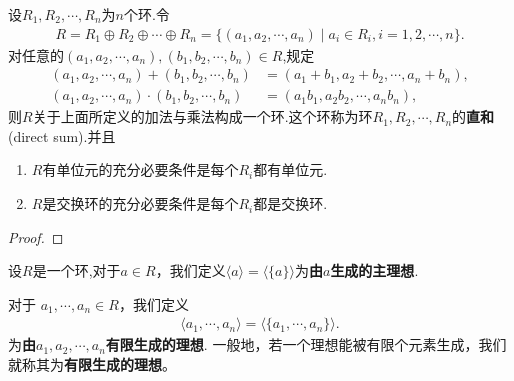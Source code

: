 \documentclass[../../main.tex]{subfiles}%
\begin{document}
\begin{theorem}
设$R_1,R_2,\cdots,R_n$为$n$个环.令
\begin{align*}
R = R_1 \oplus R_2 \oplus \cdots \oplus R_n = \{(a_1,a_2,\cdots,a_n) \mid a_i \in R_i, i=1,2,\cdots,n\}.
\end{align*}
对任意的$(a_1,a_2,\cdots,a_n),(b_1,b_2,\cdots,b_n) \in R$,规定
\begin{align*}
(a_1,a_2,\cdots,a_n) + (b_1,b_2,\cdots,b_n) &= (a_1 + b_1,a_2 + b_2,\cdots,a_n + b_n), \\
(a_1,a_2,\cdots,a_n) \cdot (b_1,b_2,\cdots,b_n) &= (a_1b_1,a_2b_2,\cdots,a_nb_n),
\end{align*}
则$R$关于上面所定义的加法与乘法构成一个环.这个环称为环$R_1,R_2,\cdots,R_n$的\textbf{直和}(direct sum).并且
\begin{enumerate}[(1)]
\item $R$有单位元的充分必要条件是每个$R_i$都有单位元.

\item $R$是交换环的充分必要条件是每个$R_i$都是交换环.
\end{enumerate}
\end{theorem}
\begin{proof}

\end{proof}

\begin{definition}
设$R$是一个环,对于$a\in R$，我们定义$\langle a\rangle=\langle \{a\} \rangle$为\textbf{由$a$生成的主理想}.

对于 $a_1, \cdots, a_n \in R$，我们定义
\begin{align*}
\langle a_1, \cdots, a_n\rangle = \langle\{a_1, \cdots, a_n\}\rangle.
\end{align*}
为\textbf{由$a_1,a_2,\cdots,a_n$有限生成的理想}.
一般地，若一个理想能被有限个元素生成，我们就称其为\textbf{有限生成的理想}。 
\end{definition}
\end{document}

